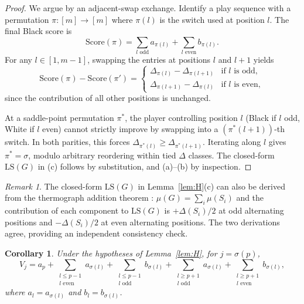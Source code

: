 \documentclass[11pt,a4paper]{amsart}
\newtheorem{corollary}[theorem]{Corollary}
\theoremstyle{definition}
\theoremstyle{remark}
\newtheorem{remark}[theorem]{Remark}
\newcommand{\LS}{\mathrm{LS}}
\begin{document}
\begin{proof}
We argue by an adjacent-swap exchange.
Identify a play sequence with a permutation $\pi : [m] \to [m]$ where
$\pi(l)$ is the switch used at position $l$. The final Black score is
\[
  \mathrm{Score}(\pi) = \sum_{l \text{ odd}} a_{\pi(l)} +
    \sum_{l \text{ even}} b_{\pi(l)}.
\]
For any $l \in [1, m-1]$, swapping the entries at positions $l$ and
$l+1$ yields
\[
  \mathrm{Score}(\pi) - \mathrm{Score}(\pi') =
  \begin{cases}
    \Delta_{\pi(l)} - \Delta_{\pi(l+1)} & \text{if $l$ is odd},
    \\
    \Delta_{\pi(l+1)} - \Delta_{\pi(l)} & \text{if $l$ is even},
  \end{cases}
\]
since the contribution of all other positions is unchanged.

At a saddle-point permutation $\pi^*$, the player controlling position $l$
(Black if $l$ odd, White if $l$ even) cannot strictly improve by swapping
into a $(\pi^*(l+1))$-th switch. In both parities, this forces
$\Delta_{\pi^*(l)} \geq \Delta_{\pi^*(l+1)}$. Iterating along $l$ gives
$\pi^* = \sigma$, modulo arbitrary reordering within tied $\Delta$
classes. The closed-form $\LS(G)$ in (c) follows by substitution, and
(a)--(b) by inspection.
\end{proof}

\begin{remark}\label{rem:thermograph}
The closed-form $\LS(G)$ in Lemma~\ref{lem:H}(c) can also be derived
from the thermograph addition theorem \cite[Ch.~6]{BCG1982}:
$\mu(G) = \sum_i \mu(S_i)$ and the contribution of each component to
$\LS(G)$ is $+\Delta(S_i)/2$ at odd alternating positions and
$-\Delta(S_i)/2$ at even alternating positions. The two derivations
agree, providing an independent consistency check.
\end{remark}

\begin{corollary}\label{cor:Vj}
Under the hypotheses of Lemma~\ref{lem:H}, for $j = \sigma(p)$,
\[
  V_j = a_p
  + \!\!\sum_{\substack{l \leq p-1 \\ l \text{ even}}}\!\! a_{\sigma(l)}
  + \!\!\sum_{\substack{l \leq p-1 \\ l \text{ odd}}}\!\! b_{\sigma(l)}
  + \!\!\sum_{\substack{l \geq p+1 \\ l \text{ odd}}}\!\! a_{\sigma(l)}
  + \!\!\sum_{\substack{l \geq p+1 \\ l \text{ even}}}\!\! b_{\sigma(l)},
\]
where $a_l = a_{\sigma(l)}$ and $b_l = b_{\sigma(l)}$.
\end{corollary}
\end{document}
